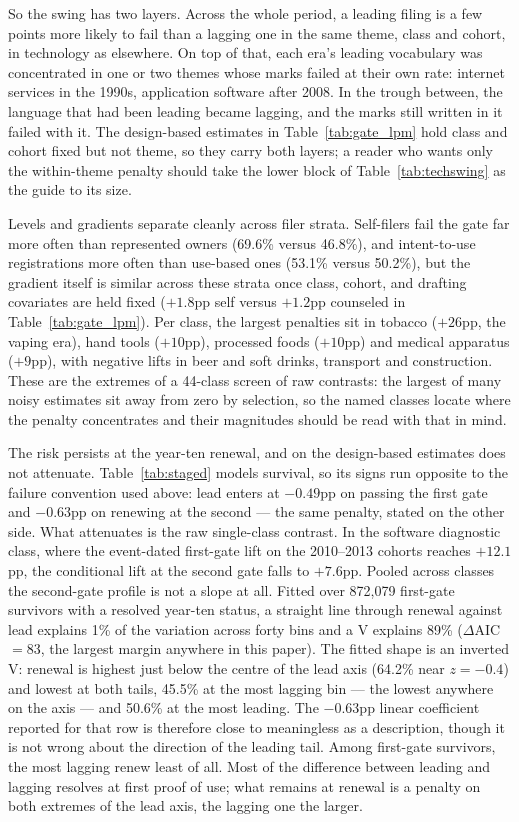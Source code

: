 So the swing has two layers. Across the whole period, a leading filing is a
few points more likely to fail than a lagging one in the same theme, class
and cohort, in technology as elsewhere. On top of that, each era's leading
vocabulary was concentrated in one or two themes whose marks failed at
their own rate: internet services in the 1990s, application software after
2008. In the trough between, the language that had been leading became
lagging, and the marks still written in it failed with it. The
design-based estimates in Table~\ref{tab:gate_lpm} hold class and cohort
fixed but not theme, so they carry both layers; a reader who wants only the
within-theme penalty should take the lower block of Table~\ref{tab:techswing}
as the guide to its size.

Levels and gradients separate cleanly across filer strata. Self-filers
fail the gate far more often than represented owners (69.6\% versus
46.8\%), and intent-to-use registrations more often than use-based ones
(53.1\% versus 50.2\%),
but the \dkl{} gradient itself is similar across these strata once class,
cohort, and drafting covariates are held fixed ($+1.8$pp self versus
$+1.2$pp counseled in Table~\ref{tab:gate_lpm}). Per class, the largest penalties sit in tobacco ($+26$pp, the
vaping era), hand tools ($+10$pp), processed foods ($+10$pp) and medical
apparatus ($+9$pp), with negative lifts in beer and soft drinks, transport
and construction. These are the extremes of a 44-class screen of raw
contrasts: the largest of many noisy estimates sit away from zero by
selection, so the named classes locate where the penalty concentrates and
their magnitudes should be read with that in mind.

The risk persists at the year-ten renewal, and on the design-based
estimates does not attenuate. Table~\ref{tab:staged} models survival, so its
signs run opposite to the failure convention used above: lead enters at
$-0.49$pp on passing the first gate and $-0.63$pp on renewing at the
second --- the same penalty, stated on the other side. What attenuates is
the raw single-class contrast. In the
software diagnostic class, where the event-dated first-gate lift on the
2010--2013 cohorts reaches $+12.1$pp, the conditional lift at the second
gate falls to $+7.6$pp. Pooled across classes the second-gate profile is not
a slope at all. Fitted over 872{,}079 first-gate survivors with a resolved
year-ten status, a straight line through renewal against lead explains 1\% of
the variation across forty bins and a V explains 89\%
($\Delta$AIC $= 83$, the largest margin anywhere in this paper). The fitted shape is an inverted V: renewal is highest just below the
centre of the lead axis (64.2\% near $z = -0.4$) and lowest at both
tails, 45.5\% at the most lagging bin --- the lowest anywhere on the
axis --- and 50.6\% at the most leading. The
$-0.63$pp linear coefficient reported for that row is therefore close to
meaningless as a description, though it is not wrong about the direction of the
leading tail. Among first-gate survivors, the most lagging renew least of all. Most of
the difference between leading and lagging resolves at first proof of use;
what remains at renewal is a penalty on both extremes of the lead axis,
the lagging one the larger.


